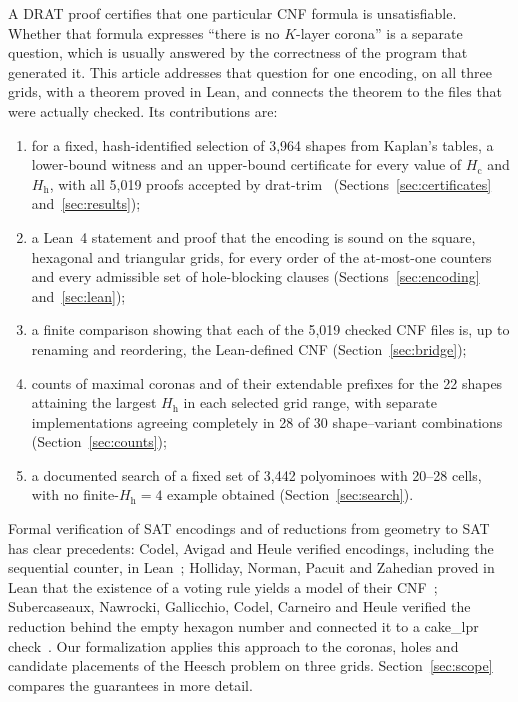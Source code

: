 \documentclass[10pt,a4paper]{article}
\theoremstyle{definition}
\theoremstyle{remark}
\newcommand{\Hc}{H_{\mathrm c}}
\newcommand{\Hh}{H_{\mathrm h}}
\begin{document}
A DRAT proof certifies that one particular CNF formula is unsatisfiable.
Whether that formula expresses ``there is no $K$-layer corona'' is a
separate question, which is usually answered by the correctness of the
program that generated it. This article addresses that question for one
encoding, on all three grids, with a theorem proved in Lean, and connects
the theorem to the files that were actually checked. Its contributions
are:
\begin{enumerate}
\item for a fixed, hash-identified selection of 3,964 shapes from
Kaplan's tables, a lower-bound witness and an upper-bound certificate for
every value of $\Hc$ and $\Hh$, with all 5,019 proofs accepted by
drat-trim~\cite{dratTrim} (Sections~\ref{sec:certificates}
and~\ref{sec:results});
\item a Lean~4 statement and proof that the encoding is sound on the
square, hexagonal and triangular grids, for every order of the
at-most-one counters and every admissible set of hole-blocking clauses
(Sections~\ref{sec:encoding} and~\ref{sec:lean});
\item a finite comparison showing that each of the 5,019 checked CNF files
is, up to renaming and reordering, the Lean-defined CNF
(Section~\ref{sec:bridge});
\item counts of maximal coronas and of their extendable prefixes for the
22 shapes attaining the largest $\Hh$ in each selected grid range, with
separate implementations agreeing completely in 28 of 30 shape--variant
combinations (Section~\ref{sec:counts});
\item a documented search of a fixed set of 3,442 polyominoes with 20--28
cells, with no finite-$\Hh=4$ example obtained
(Section~\ref{sec:search}).
\end{enumerate}
Formal verification of SAT encodings and of reductions from geometry to
SAT has clear precedents: Codel, Avigad and Heule verified encodings,
including the sequential counter, in Lean~\cite{CodelThesis,CAH}; Holliday,
Norman, Pacuit and Zahedian proved in Lean that the existence of a
voting rule yields a model of their CNF~\cite{Holliday}; Subercaseaux,
Nawrocki, Gallicchio, Codel, Carneiro and Heule verified the reduction
behind the empty hexagon number and connected it to a cake\_lpr
check~\cite{EmptyHex}. Our formalization applies this approach to the
coronas, holes and candidate placements of the Heesch problem on three
grids. Section~\ref{sec:scope} compares the guarantees in more detail.
\end{document}
